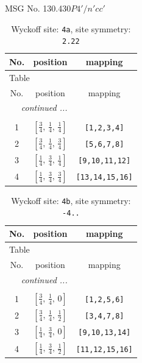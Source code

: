 \documentclass[fleqn,8pt]{jsarticle}
\begin{document}
\setcounter{MaxMatrixCols}{32}

\renewcommand{\tablename}{Table~}
\renewcommand{\figurename}{Figure~}
\begin{center}
\LARGE
MSG No. 130.430\quad$P4'/n'cc'$
\end{center}
\renewcommand{\arraystretch}{1.2}
\begin{longtable}{ccc}
\caption{Wyckoff site: {\tt 4a}, site symmetry: {\tt 2.22}}
 \\
 \hline \hline
No. & position & mapping \\ \hline \endfirsthead

\multicolumn{2}{l}{\tablename\ \thetable{}} \\
 \hline \hline
No. & position & mapping \\ \hline \endhead

 \hline \hline
\multicolumn{2}{r}{\footnotesize\it continued ...} \\ \endfoot

 \hline \hline
\multicolumn{2}{r}{} \\ \endlastfoot

1 & $\left[ \frac{3}{4},\, \frac{1}{4},\, \frac{1}{4} \right]$ & {\tt [1,2,3,4]} \\ \hline
2 & $\left[ \frac{3}{4},\, \frac{1}{4},\, \frac{3}{4} \right]$ & {\tt [5,6,7,8]} \\ \hline
3 & $\left[ \frac{1}{4},\, \frac{3}{4},\, \frac{1}{4} \right]$ & {\tt [9,10,11,12]} \\ \hline
4 & $\left[ \frac{1}{4},\, \frac{3}{4},\, \frac{3}{4} \right]$ & {\tt [13,14,15,16]} \\
\end{longtable}
\renewcommand{\arraystretch}{1.2}
\begin{longtable}{ccc}
\caption{Wyckoff site: {\tt 4b}, site symmetry: {\tt -4..}}
 \\
 \hline \hline
No. & position & mapping \\ \hline \endfirsthead

\multicolumn{2}{l}{\tablename\ \thetable{}} \\
 \hline \hline
No. & position & mapping \\ \hline \endhead

 \hline \hline
\multicolumn{2}{r}{\footnotesize\it continued ...} \\ \endfoot

 \hline \hline
\multicolumn{2}{r}{} \\ \endlastfoot

1 & $\left[ \frac{3}{4},\, \frac{1}{4},\, 0 \right]$ & {\tt [1,2,5,6]} \\ \hline
2 & $\left[ \frac{3}{4},\, \frac{1}{4},\, \frac{1}{2} \right]$ & {\tt [3,4,7,8]} \\ \hline
3 & $\left[ \frac{1}{4},\, \frac{3}{4},\, 0 \right]$ & {\tt [9,10,13,14]} \\ \hline
4 & $\left[ \frac{1}{4},\, \frac{3}{4},\, \frac{1}{2} \right]$ & {\tt [11,12,15,16]} \\
\end{longtable}
\end{document}
